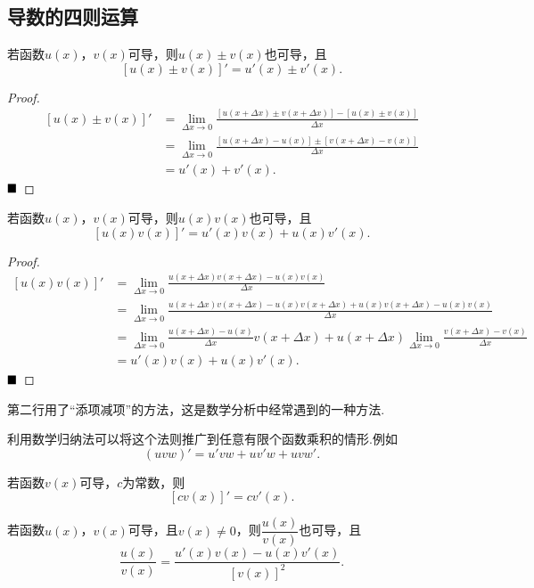 \subsection{导数的四则运算}
\begin{theorem}[加减法公式]
	若函数$u(x)$，$v(x)$可导，则$u(x)\pm v(x)$也可导，且
	$$\left[u(x)\pm v(x)\right]'=u'(x)\pm v'(x).$$
\end{theorem}
\begin{proof}
	\begin{align*}
		\left[u(x)\pm v(x)\right]'&=\lim\limits_{\Delta x\to 0}\frac{\left[u(x+\Delta x)\pm v(x+\Delta x)\right]-\left[u(x)\pm v(x)\right]}{\Delta x}\\
		&=\lim\limits_{\Delta x\to 0}\frac{\left[u(x+\Delta x)-u(x)\right]\pm \left[v(x+\Delta x)-v(x)\right]}{\Delta x}\\
		&=u'(x)+v'(x).
	\end{align*}
	$\hfill\blacksquare$
\end{proof}
\begin{theorem}[乘法公式]
	若函数$u(x)$，$v(x)$可导，则$u(x)v(x)$也可导，且
	$$\left[u(x)v(x)\right]'=u'(x)v(x)+u(x)v'(x).$$
\end{theorem}
\begin{proof}
	\begin{align*}
		\left[u(x)v(x)\right]'&=\lim\limits_{\Delta x\to 0}\frac{u(x+\Delta x)v(x+\Delta x)-u(x)v(x)}{\Delta x}\\
		&=\lim\limits_{\Delta x\to 0}\frac{u(x+\Delta x)v(x+\Delta x)-u(x)v(x+\Delta x)+u(x)v(x+\Delta x)-u(x)v(x)}{\Delta x}\\
		&=\lim\limits_{\Delta x\to 0}\frac{u(x+\Delta x)-u(x)}{\Delta x}v(x+\Delta x)+u(x+\Delta x)\lim\limits_{\Delta x\to 0}\frac{v(x+\Delta x)-v(x)}{\Delta x}\\
		&=u'(x)v(x)+u(x)v'(x).
	\end{align*}
	$\hfill\blacksquare$
\end{proof}
\begin{remark}
	第二行用了“添项减项”的方法，这是数学分析中经常遇到的一种方法.
\end{remark}
\begin{remark}
	利用数学归纳法可以将这个法则推广到任意有限个函数乘积的情形.例如
	$$(uvw)'=u'vw+uv'w+uvw'.$$
\end{remark}
\begin{corollary}
	若函数$v(x)$可导，$c$为常数，则
	$$\left[cv(x)\right]'=cv'(x).$$
\end{corollary}
\begin{theorem}[除法公式]
	若函数$u(x)$，$v(x)$可导，且$v(x)\neq 0$，则$\dfrac{u(x)}{v(x)}$也可导，且
	$$\frac{u(x)}{v(x)}=\frac{u'(x)v(x)-u(x)v'(x)}{\left[v(x)\right]^2}.$$
\end{theorem}
